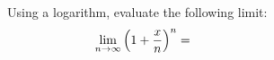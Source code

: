 Using a logarithm, evaluate the following limit:
    $$\lim_{n\to\infty} \left(1 + \frac{x}{n}\right)^n = \hspace{2.0in}$$